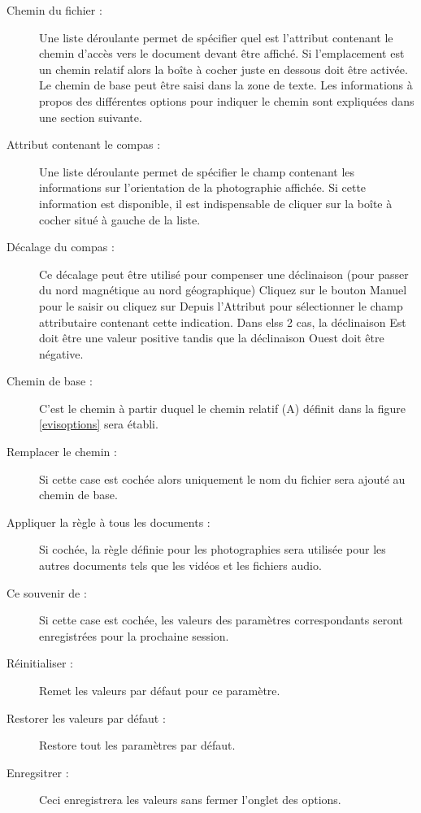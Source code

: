 \begin{description}
\item[Chemin du fichier :] Une liste déroulante permet de spécifier quel est l'attribut contenant le chemin d'accès vers le document devant être affiché. Si l'emplacement est un chemin relatif alors la boîte à cocher juste en dessous doit être activée. Le chemin de base peut être saisi dans la zone de texte. Les informations à propos des différentes options pour indiquer le chemin sont expliquées dans une section suivante.
\item[Attribut contenant le compas :] Une liste déroulante permet de spécifier le champ contenant les informations sur l'orientation de la photographie affichée. Si cette information est disponible, il est indispensable de cliquer sur la boîte à cocher situé à gauche de la liste.
\item[Décalage du compas :] Ce décalage peut être utilisé pour compenser une déclinaison (pour passer du nord magnétique au nord géographique) Cliquez sur le bouton Manuel pour le saisir  ou cliquez sur Depuis l'Attribut pour sélectionner le champ attributaire contenant cette indication. Dans elss 2 cas, la déclinaison Est doit être une valeur positive tandis que la déclinaison Ouest doit être négative.
\item[Chemin de base :] C'est le chemin à partir duquel le chemin relatif (A) définit dans la figure \ref{evisoptions} sera établi.
\item[Remplacer le chemin :] Si cette case est cochée alors uniquement le nom du fichier sera ajouté au chemin de base.
\item[Appliquer la règle à tous les documents :] Si cochée, la règle définie pour les photographies sera utilisée pour les autres documents tels que les vidéos et les fichiers audio.
\item[Ce souvenir de :] Si cette case est cochée, les valeurs des paramètres correspondants seront enregistrées pour la prochaine session.
\item[Réinitialiser :] Remet les valeurs par défaut pour ce paramètre.
\item[Restorer les valeurs par défaut :] Restore tout les paramètres par défaut.
\item[Enregsitrer :] Ceci enregistrera les valeurs sans fermer l'onglet des options.
\end{description}

\label{evis_external_window}

